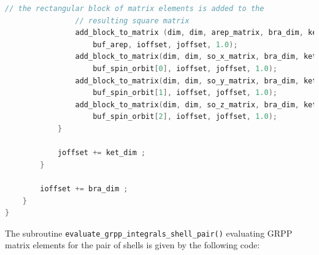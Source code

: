 \documentclass[12pt]{article}
\begin{document}
\begin{lstlisting}[language=C++]
                // the rectangular block of matrix elements is added to the
                // resulting square matrix
                add_block_to_matrix (dim, dim, arep_matrix, bra_dim, ket_dim,
                    buf_arep, ioffset, joffset, 1.0);
                add_block_to_matrix(dim, dim, so_x_matrix, bra_dim, ket_dim,
                    buf_spin_orbit[0], ioffset, joffset, 1.0);
                add_block_to_matrix(dim, dim, so_y_matrix, bra_dim, ket_dim,
                    buf_spin_orbit[1], ioffset, joffset, 1.0);
                add_block_to_matrix(dim, dim, so_z_matrix, bra_dim, ket_dim,
                    buf_spin_orbit[2], ioffset, joffset, 1.0);
            }
            
            joffset += ket_dim ;
        }
        
        ioffset += bra_dim ;
    }
}
\end{lstlisting}

The subroutine \texttt{evaluate\_grpp\_integrals\_shell\_pair()} evaluating GRPP matrix elements for the pair of shells is given by the following code:
\end{document}
